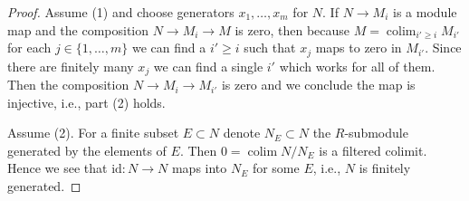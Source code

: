 \documentclass[10pt,a4paper]{amsart}
\theoremstyle{plain}
\theoremstyle{definition}
\theoremstyle{remark}
\numberwithin{equation}{subsection}
\def\colim{\mathop{\mathrm{colim}}\nolimits}
\begin{document}
\begin{proof}
Assume (1) and choose generators $x_1, \ldots, x_m$ for $N$.
If $N \to M_i$ is a module map and the composition
$N \to M_i \to M$ is zero, then because $M = \colim_{i' \geq i} M_{i'}$
for each $j \in \{1, \ldots, m\}$ we can find a $i' \geq i$ such that
$x_j$ maps to zero in $M_{i'}$. Since there are finitely many
$x_j$ we can find a single $i'$ which works for all of them.
Then the composition $N \to M_i \to M_{i'}$ is zero and we conclude
the map is injective, i.e., part (2) holds.

\medskip\noindent
Assume (2). For a finite subset $E \subset N$ denote $N_E \subset N$
the $R$-submodule generated by the elements of $E$. Then
$0 = \colim N/N_E$ is a filtered colimit. Hence we see that
$\text{id} : N \to N$ maps into $N_E$ for some $E$, i.e., $N$
is finitely generated.
\end{proof}
\end{document}

